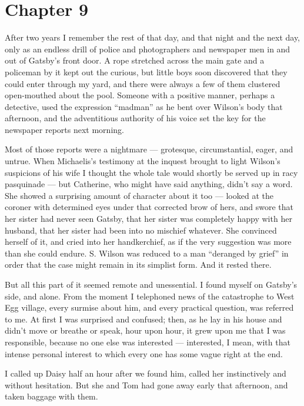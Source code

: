 \documentclass{znotebook}
\begin{document}
\chapter{Chapter 9}

After two years I remember the rest of that day, and that night and the next day, only as an endless drill of police and photographers and newspaper men in and out of Gatsby’s front door. A rope stretched across the main gate and a policeman by it kept out the curious, but little boys soon discovered that they could enter through my yard, and there were always a few of them clustered open-mouthed about the pool. Someone with a positive manner, perhaps a detective, used the expression ``madman'' as he bent over Wilson’s body that afternoon, and the adventitious authority of his voice set the key for the newspaper reports next morning.

Most of those reports were a nightmare — grotesque, circumstantial, eager, and untrue. When Michaelis’s testimony at the inquest brought to light Wilson’s suspicions of his wife I thought the whole tale would shortly be served up in racy pasquinade — but Catherine, who might have said anything, didn’t say a word. She showed a surprising amount of character about it too — looked at the coroner with determined eyes under that corrected brow of hers, and swore that her sister had never seen Gatsby, that her sister was completely happy with her husband, that her sister had been into no mischief whatever. She convinced herself of it, and cried into her handkerchief, as if the very suggestion was more than she could endure. S. Wilson was reduced to a man ``deranged by grief'' in order that the case might remain in its simplist form. And it rested there.

But all this part of it seemed remote and unessential. I found myself on Gatsby’s side, and alone. From the moment I telephoned news of the catastrophe to West Egg village, every surmise about him, and every practical question, was referred to me. At first I was surprised and confused; then, as he lay in his house and didn’t move or breathe or speak, hour upon hour, it grew upon me that I was responsible, because no one else was interested — interested, I mean, with that intense personal interest to which every one has some vague right at the end.

I called up Daisy half an hour after we found him, called her instinctively and without hesitation. But she and Tom had gone away early that afternoon, and taken baggage with them.
\end{document}
